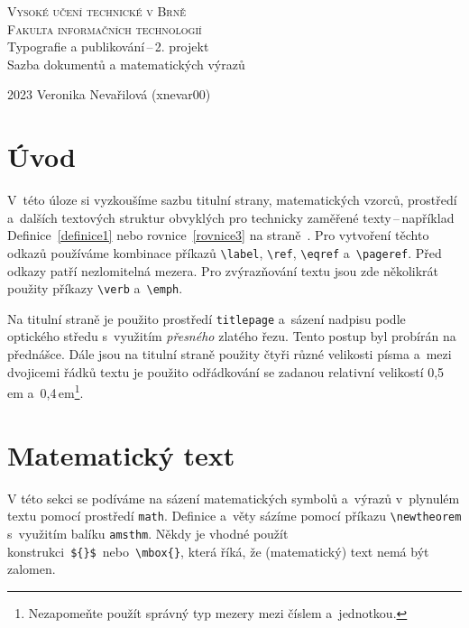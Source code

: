 \documentclass[hidelinks ,twoside, 11pt ,twocolumn, a4paper]{article}
\begin{document}
\begin{titlepage}
        \thispagestyle{empty}
        \begin{center}
            \Huge
            \textsc{Vysoké učení technické v Brně\\}
            \vspace{0.5em}
            \huge
            \textsc{Fakulta informačních technologií\\}
            \LARGE
            Typografie a publikování\,--\,2. projekt \\
            \vspace{0.4em}
            Sazba dokumentů a matematických výrazů\\
        \end{center}
        {\Large 2023 \hfill Veronika Nevařilová (xnevar00)}
    \end{titlepage}

\clearpage
{}
\section*{Úvod}
V~této úloze si vyzkoušíme sazbu titulní strany, matematických vzorců, prostředí a~dalších textových struktur obvyklých pro technicky zaměřené texty\,--\,například Definice~\ref{definice1} nebo rovnice~\eqref{rovnice3} na straně~\pageref{rovnice3}. Pro vytvoření těchto odkazů používáme kombinace příkazů \verb|\label|, \verb|\ref|, \verb|\eqref| a~\verb|\pageref|. Před odkazy patří nezlomitelná mezera. Pro zvýrazňování textu jsou zde několikrát použity příkazy \verb|\verb| a~\verb|\emph|. 

Na titulní straně je použito prostředí \verb|titlepage| a~sázení nadpisu podle optického středu s~využitím \textit{přesného} zlatého řezu. Tento postup byl probírán na přednášce. Dále jsou na titulní straně použity čtyři různé velikosti písma a~mezi dvojicemi řádků textu je použito odřádkování se zadanou relativní velikostí 0,5\,em a~0,4\,em\footnote{Nezapomeňte použít správný typ mezery mezi číslem a~jednotkou.}.

\section{Matematický text}
V této sekci se podíváme na sázení matematických symbolů a~výrazů v~plynulém textu pomocí prostředí \verb|math|. Definice a~věty sázíme pomocí příkazu \verb|\newtheorem| s~využitím balíku \verb|amsthm|. Někdy je vhodné použít konstrukci\ \verb|${}$|\ nebo\ \verb|\mbox{}|, která říká, že (matematický) text nemá být zalomen.
\end{document}
